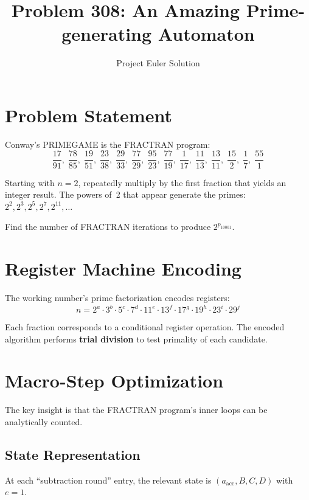 \documentclass[12pt]{article}
\title{Problem 308: An Amazing Prime-generating Automaton}
\author{Project Euler Solution}
\date{}
\begin{document}
\maketitle

\section{Problem Statement}
Conway's PRIMEGAME is the FRACTRAN program:
\[
    \frac{17}{91},\; \frac{78}{85},\; \frac{19}{51},\; \frac{23}{38},\; \frac{29}{33},\; \frac{77}{29},\; \frac{95}{23},\; \frac{77}{19},\; \frac{1}{17},\; \frac{11}{13},\; \frac{13}{11},\; \frac{15}{2},\; \frac{1}{7},\; \frac{55}{1}
\]

Starting with $n = 2$, repeatedly multiply by the first fraction that yields an integer result. The powers of~2 that appear generate the primes: $2^2, 2^3, 2^5, 2^7, 2^{11}, \ldots$

Find the number of FRACTRAN iterations to produce $2^{p_{10001}}$.

\section{Register Machine Encoding}

The working number's prime factorization encodes registers:
\[
    n = 2^a \cdot 3^b \cdot 5^c \cdot 7^d \cdot 11^e \cdot 13^f \cdot 17^g \cdot 19^h \cdot 23^i \cdot 29^j
\]

Each fraction corresponds to a conditional register operation. The encoded algorithm performs \textbf{trial division} to test primality of each candidate.

\section{Macro-Step Optimization}

The key insight is that the FRACTRAN program's inner loops can be analytically counted.

\subsection{State Representation}
At each ``subtraction round'' entry, the relevant state is $(a_{\mathrm{acc}}, B, C, D)$ with $e=1$.
\end{document}
